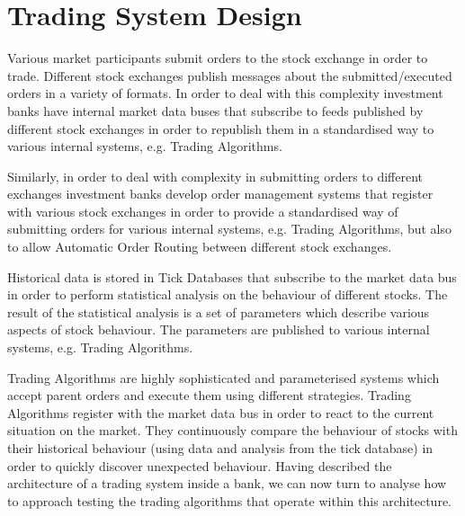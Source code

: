 \section{Trading System Design} 

Various market participants submit orders to the stock exchange in order to trade. Different stock exchanges publish messages about the submitted/executed orders in a variety of formats. In order to deal with this complexity investment banks have internal market data buses that subscribe to feeds published by different stock exchanges in order to republish them in a standardised way to various internal systems, e.g. Trading Algorithms.

Similarly, in order to deal with complexity in submitting orders to different exchanges investment banks develop order management systems that register with various stock exchanges in order to provide a standardised way of submitting orders for various internal systems, e.g. Trading Algorithms, but also to allow Automatic Order Routing between different stock exchanges.

Historical data is stored in Tick Databases that subscribe to the market data bus in order to perform statistical analysis on the behaviour of different stocks. The result of the statistical analysis is a set of parameters which describe various aspects of stock behaviour. The parameters are published to various internal systems, e.g. Trading Algorithms.

Trading Algorithms are highly sophisticated and parameterised systems which accept parent orders and execute them using different strategies. Trading Algorithms register with the market data bus in order to react to the current situation on the market. They continuously compare the behaviour of stocks with their historical behaviour (using data and analysis from the tick database) in order to quickly discover unexpected behaviour. Having described the architecture of a trading system inside a bank, we can now turn to analyse how to approach testing the trading algorithms that operate within this architecture.
